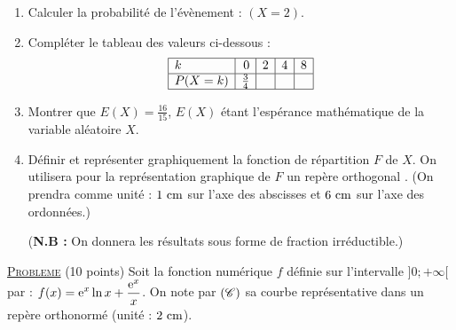 \begin{enumerate}
\begin{enumerate}
                        \item Calculer la probabilit\'e de l'\'ev\`enement : $(X = 2)$.
                        \item Compl\'eter le tableau des valeurs ci-dessous :
                              \[
                                    \begin{array}{|l|r|r|r|r|}
                                          \hline
                                                k         & 0           & 2       & 4      & 8      \\
                                          \hline
                                                P(X = k)  & \frac{3}{4} &         &        &        \\
                                          \hline
                                    \end{array}
                              \]
                        \item Montrer que $E(X) = \frac{16}{15}$, $E(X)$ \'etant l'esp\'erance math\'ematique de 
                              la variable al\'eatoire $X$.
                        \item D\'efinir et repr\'esenter graphiquement la fonction de r\'epartition $F$ de $X$.
                              On utilisera pour la repr\'esentation graphique de $F$ un rep\`ere orthogonal \Oij .
                              (On prendra comme unit\'e : $1 ~\mathrm{cm}$ sur l'axe des abscisses et $6 ~\mathrm{cm}$ sur l'axe des ordonn\'ees.)
                              
                              (\textbf{N.B :} On donnera les r\'esultats sous forme de fraction irr\'eductible.)
                  \end{enumerate}
      \end{enumerate}
\noindent \underline{\textsc{Probleme}} (10 points) \newline
      Soit la fonction num\'erique $f$ d\'efinie sur l'intervalle $]0;+\infty[$ par : 
      $\displaystyle{f(x) = \mathrm{e}^{x} \ln x + \frac{\mathrm{e}^{x}}{x}}$.
      On note par $(\mathscr{C})$ sa courbe repr\'esentative dans un rep\`ere orthonorm\'e \Oij{} (unit\'e : $2 ~\mathrm{cm}$).
